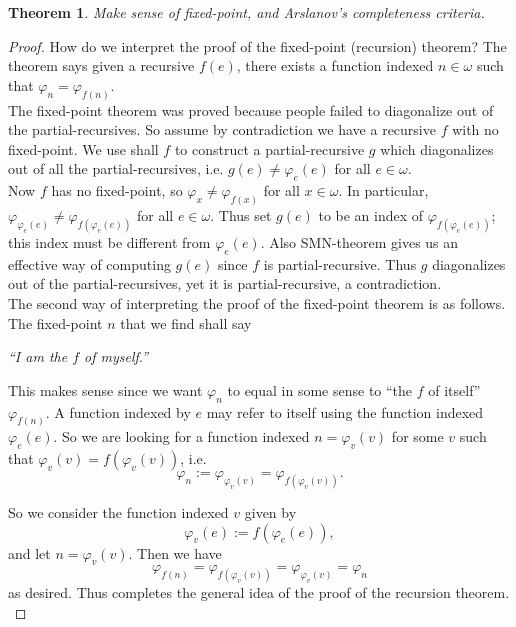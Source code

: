 \documentclass{article}
\newtheorem{theorem}{Theorem}[subsection]
\begin{document}
    \begin{theorem}
      Make sense of fixed-point, and Arslanov's completeness criteria.
    \end{theorem}
    \begin{proof}
      How do we interpret the proof of the fixed-point (recursion) theorem?
      The theorem says given a recursive $f(e)$, there exists a function
      indexed $n\in\omega$ such that $\varphi_n=\varphi_{f(n)}$.\\

      The fixed-point theorem was proved because people failed to
      diagonalize out of the partial-recursives. So assume by contradiction
      we have a recursive $f$ with no fixed-point. We use shall $f$ to
      construct a partial-recursive $g$ which diagonalizes out of all the
      partial-recursives, i.e. $g(e)\neq\varphi_e(e)$ for all
      $e\in\omega$.\\

      Now $f$ has no fixed-point, so $\varphi_x\neq\varphi_{f(x)}$ for all
      $x\in\omega$. In particular, $\varphi_{\varphi_e(e)} \neq
      \varphi_{f(\varphi_e(e))}$ for all $e\in\omega$. Thus set $g(e)$ to
      be an index of $\varphi_{f(\varphi_e(e))}$; this index must be
      different from $\varphi_e(e)$. Also SMN-theorem gives us an effective
      way of computing $g(e)$ since $f$ is partial-recursive. Thus $g$
      diagonalizes out of the partial-recursives, yet it is
      partial-recursive, a contradiction.\\

      The second way of interpreting the proof of the fixed-point theorem
      is as follows. The fixed-point $n$ that we find shall say
      \begin{center}
        \textit{``I am the $f$ of myself.''}
      \end{center}

      This makes sense since we want $\varphi_n$ to equal in some sense to
      ``the $f$ of itself'' $\varphi_{f(n)}$. A function indexed by $e$ may
      refer to itself using the function indexed $\varphi_e(e)$. So we are
      looking for a function indexed $n=\varphi_v(v)$ for some $v$ such
      that
      $\varphi_v(v)=f(\varphi_v(v))$, i.e.
      \[\varphi_n :=\varphi_{\varphi_v(v)} =\varphi_{f(\varphi_v(v))}.\]

      So we consider the function indexed $v$ given by
      \[\varphi_v(e) :=f(\varphi_e(e)),\]
      and let $n=\varphi_v(v)$. Then we have
      \[\varphi_{f(n)} =\varphi_{f(\varphi_v(v))} =\varphi_{\varphi_v(v)}
      =\varphi_n\]
      as desired. Thus completes the general idea of the proof of the
      recursion theorem. \\


\end{proof}
\end{document}
